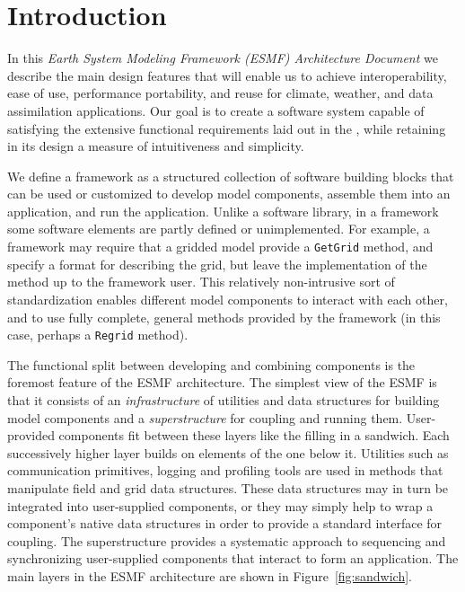 \section{Introduction}
\label{sec:intro}

In this {\it Earth System Modeling Framework (ESMF) Architecture Document} we describe 
the main design features that will enable us to achieve interoperability, ease of 
use, performance portability, and reuse for climate, weather, and data assimilation
applications.  Our goal is to create a software system capable of satisfying
the extensive functional requirements laid out in the  \cite{bib:ESMFreqdoc}, 
while retaining in its design a measure of intuitiveness and simplicity. 

We define a framework as a structured collection of software building blocks 
that can be used or customized to develop model components, assemble them into an 
application, and run the application.  Unlike a software library, in a framework some
software elements are partly defined or unimplemented.  For example, a framework
may require that a gridded model provide a {\tt GetGrid} method, and specify 
a format for describing the grid, but leave the implementation of the method up
to the framework user.  This relatively non-intrusive sort of standardization enables 
different model components to interact with each other, and to use fully
complete, general methods provided by the framework (in this case, perhaps a 
{\tt Regrid} method).

The functional split between developing and combining components is the
foremost feature of the ESMF architecture.  The simplest view of the ESMF 
is that it consists of an {\it infrastructure} of utilities and data 
structures for building model components and a {\it superstructure} for coupling 
and running them.  User-provided components fit between these 
layers like the filling in a sandwich.  Each successively higher layer builds
on elements of the one below it.  Utilities such as communication
primitives, logging and profiling tools are used in methods that
manipulate field and grid data structures.  These data structures may in 
turn be integrated into user-supplied components, or they may simply 
help to wrap a component's native data structures in order to provide 
a standard interface for coupling.  The superstructure provides a systematic 
approach to sequencing and synchronizing user-supplied components that 
interact to form an application.  The main layers in the ESMF architecture are 
shown in Figure~\ref{fig:sandwich}.  

